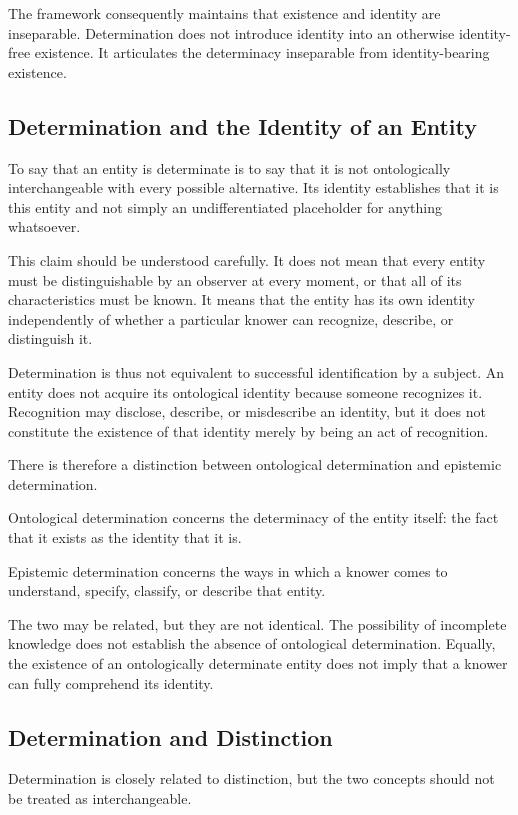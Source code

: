 The framework consequently maintains that existence and identity are
inseparable. Determination does not introduce identity into an otherwise
identity-free existence. It articulates the determinacy inseparable from
identity-bearing existence.

\subsection{Determination and the Identity of an Entity}

To say that an entity is determinate is to say that it is not
ontologically interchangeable with every possible alternative. Its
identity establishes that it is this entity and not simply an
undifferentiated placeholder for anything whatsoever.

This claim should be understood carefully. It does not mean that every
entity must be distinguishable by an observer at every moment, or that
all of its characteristics must be known. It means that the entity has
its own identity independently of whether a particular knower can
recognize, describe, or distinguish it.

Determination is thus not equivalent to successful identification by
a subject. An entity does not acquire its ontological identity because
someone recognizes it. Recognition may disclose, describe, or
misdescribe an identity, but it does not constitute the existence of
that identity merely by being an act of recognition.

There is therefore a distinction between ontological determination
and epistemic determination.

Ontological determination concerns the determinacy of the entity
itself: the fact that it exists as the identity that it is.

Epistemic determination concerns the ways in which a knower comes to
understand, specify, classify, or describe that entity.

The two may be related, but they are not identical. The possibility
of incomplete knowledge does not establish the absence of ontological
determination. Equally, the existence of an ontologically determinate
entity does not imply that a knower can fully comprehend its identity.

\subsection{Determination and Distinction}

Determination is closely related to distinction, but the two concepts
should not be treated as interchangeable.

